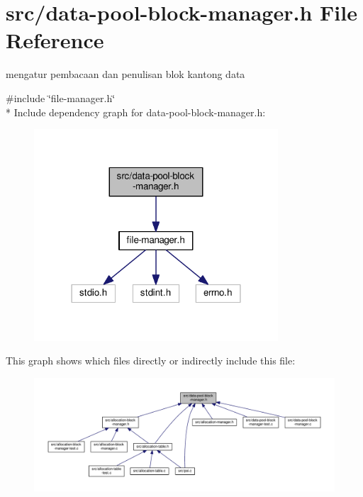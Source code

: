 \hypertarget{data-pool-block-manager_8h}{\section{src/data-\/pool-\/block-\/manager.h File Reference}
\label{data-pool-block-manager_8h}
}


mengatur pembacaan dan penulisan blok kantong data  


{\ttfamily \#include \char`\"{}file-\/manager.\-h\char`\"{}}\\*
Include dependency graph for data-\/pool-\/block-\/manager.h\-:\nopagebreak
\begin{figure}[H]
\begin{center}
\leavevmode
\includegraphics[width=258pt]{data-pool-block-manager_8h__incl}
\end{center}
\end{figure}
This graph shows which files directly or indirectly include this file\-:
\nopagebreak
\begin{figure}[H]
\begin{center}
\leavevmode
\includegraphics[width=350pt]{data-pool-block-manager_8h__dep__incl}
\end{center}
\end{figure}

